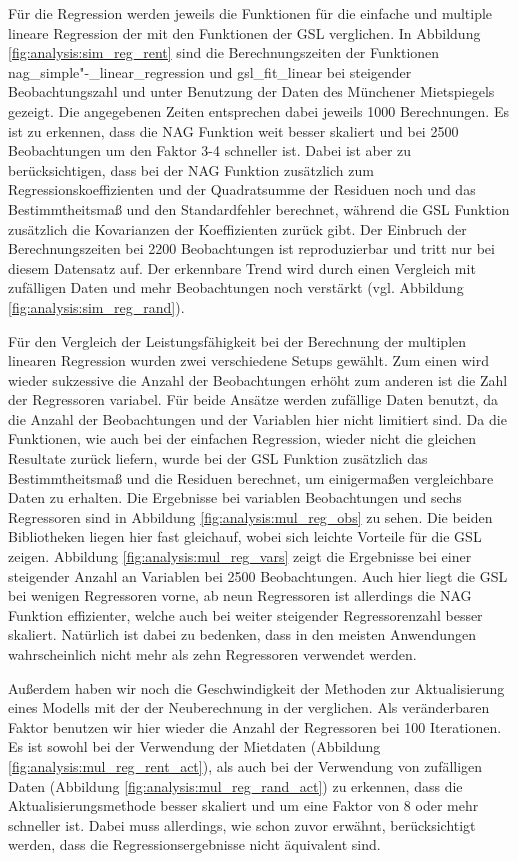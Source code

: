 Für die Regression werden jeweils die Funktionen für die einfache und multiple lineare Regression der \naglib mit den Funktionen der GSL verglichen.
In Abbildung \ref{fig:analysis:sim_reg_rent} sind die Berechnungszeiten der Funktionen nag\_simple"-\_linear\_regression und gsl\_fit\_linear bei steigender Beobachtungszahl und unter Benutzung der Daten des Münchener Mietspiegels gezeigt.
Die angegebenen Zeiten entsprechen dabei jeweils 1000 Berechnungen.
Es ist zu erkennen, dass die NAG Funktion weit besser skaliert und bei 2500 Beobachtungen um den Faktor 3-4 schneller ist.
Dabei ist aber zu berücksichtigen, dass bei der NAG Funktion zusätzlich zum Regressionskoeffizienten und der Quadratsumme der Residuen noch und das Bestimmtheitsmaß und den Standardfehler berechnet, während die GSL Funktion zusätzlich die Kovarianzen der Koeffizienten zurück gibt.
Der Einbruch der Berechnungszeiten bei 2200 Beobachtungen ist reproduzierbar und tritt nur bei diesem Datensatz auf.
Der erkennbare Trend wird durch einen Vergleich mit zufälligen Daten und mehr Beobachtungen noch verstärkt (vgl. Abbildung \ref{fig:analysis:sim_reg_rand}).

Für den Vergleich der Leistungsfähigkeit bei der Berechnung der multiplen linearen Regression wurden zwei verschiedene Setups gewählt.
Zum einen wird wieder sukzessive die Anzahl der Beobachtungen erhöht zum anderen ist die Zahl der Regressoren variabel. 
Für beide Ansätze werden zufällige Daten benutzt, da die Anzahl der Beobachtungen und der Variablen hier nicht limitiert sind.
Da die Funktionen, wie auch bei der einfachen Regression, wieder nicht die gleichen Resultate zurück liefern, wurde bei der GSL Funktion zusätzlich das Bestimmtheitsmaß und die Residuen berechnet, um einigermaßen vergleichbare Daten zu erhalten.
Die Ergebnisse bei variablen Beobachtungen und sechs Regressoren sind in Abbildung \ref{fig:analysis:mul_reg_obs} zu sehen.
Die beiden Bibliotheken liegen hier fast gleichauf, wobei sich leichte Vorteile für die GSL zeigen.
Abbildung \ref{fig:analysis:mul_reg_vars} zeigt die Ergebnisse bei einer steigender Anzahl an Variablen bei 2500 Beobachtungen.
Auch hier liegt die GSL bei wenigen Regressoren vorne, ab neun Regressoren ist allerdings die NAG Funktion effizienter, welche auch bei weiter steigender Regressorenzahl besser skaliert.
Natürlich ist dabei zu bedenken, dass in den meisten Anwendungen wahrscheinlich nicht mehr als zehn Regressoren verwendet werden.

Außerdem haben wir noch die Geschwindigkeit der Methoden zur Aktualisierung eines Modells mit der der Neuberechnung in der \naglib verglichen.
Als veränderbaren Faktor benutzen wir hier wieder die Anzahl der Regressoren bei 100 Iterationen.
Es ist sowohl bei der Verwendung der Mietdaten (Abbildung \ref{fig:analysis:mul_reg_rent_act}), als auch bei der Verwendung von zufälligen Daten (Abbildung \ref{fig:analysis:mul_reg_rand_act}) zu erkennen, dass die Aktualisierungsmethode besser skaliert und um eine Faktor von 8 oder mehr schneller ist.
Dabei muss allerdings, wie schon zuvor erwähnt, berücksichtigt werden, dass die Regressionsergebnisse nicht äquivalent sind.


